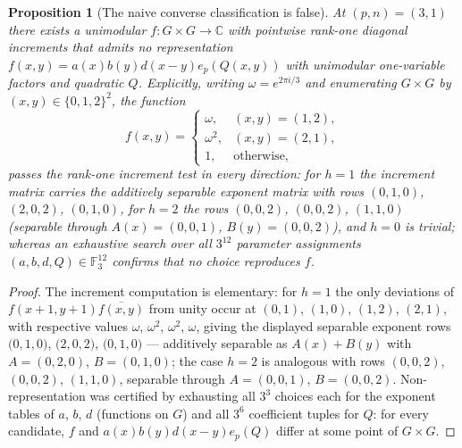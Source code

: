 \documentclass[11pt]{article}
\newtheorem{proposition}{Proposition}
\theoremstyle{remark}
\begin{document}
\begin{proposition}[The naive converse classification is false]\label{thm:E}
At $(p,n)=(3,1)$ there exists a unimodular $f:G\times G\to\mathbb{C}$ with
pointwise rank-one diagonal increments that admits \emph{no} representation
$f(x,y)=a(x)b(y)d(x-y)e_p(Q(x,y))$ with unimodular one-variable factors and
quadratic $Q$. Explicitly, writing $\omega=e^{2\pi i/3}$ and enumerating
$G\times G$ by $(x,y)\in\{0,1,2\}^2$, the function
\[
f(x,y)=\begin{cases}
\omega, & (x,y)=(1,2),\\
\omega^{2}, & (x,y)=(2,1),\\
1, & \text{otherwise},
\end{cases}
\]
passes the rank-one increment test in every direction: for $h=1$ the
increment matrix carries the additively separable exponent matrix with rows
$(0,1,0)$, $(2,0,2)$, $(0,1,0)$, for $h=2$ the rows $(0,0,2)$, $(0,0,2)$,
$(1,1,0)$ (separable through $A(x)= (0,0,1)$, $B(y)=(0,0,2)$), and $h=0$ is
trivial; whereas an exhaustive search over all $3^{12}$ parameter
assignments $(a,b,d,Q)\in\mathbb{F}_3^{12}$ confirms that no choice
reproduces $f$.
\end{proposition}

\begin{proof}
The increment computation is elementary: for $h=1$ the only deviations of
$f(x+1,y+1)\overline{f(x,y)}$ from unity occur at $(0,1)$, $(1,0)$, $(1,2)$,
$(2,1)$, with respective values $\omega$, $\omega^{2}$, $\omega^{2}$,
$\omega$, giving the displayed separable exponent rows
$\bigl(0,1,0\bigr)$, $\bigl(2,0,2\bigr)$, $\bigl(0,1,0\bigr)$ — additively
separable as $A(x)+B(y)$ with $A=(0,2,0)$, $B=(0,1,0)$; the case $h=2$ is
analogous with rows $(0,0,2)$, $(0,0,2)$, $(1,1,0)$, separable through
$A=(0,0,1)$, $B=(0,0,2)$. Non-representation was certified by exhausting all
$3^{3}$ choices each for the exponent tables of $a$, $b$, $d$ (functions on
$G$) and all $3^{6}$ coefficient tuples for $Q$: for every candidate, $f$
and $a(x)b(y)d(x-y)e_p(Q)$ differ at some point of $G\times G$.
\end{proof}
\end{document}
